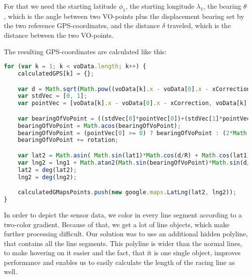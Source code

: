 For that we need the starting latitude $\phi_1$, the starting longitude $\lambda_1$, the bearing $\theta$, which is the angle between two VO-points plus the displacement bearing set by the two reference GPS-coordinates, and the distance $\delta$ traveled, which is the distance between the two VO-points.

The resulting GPS-coordinates are calculated like this:

\begin{lstlisting}[language=JavaScript]
for (var k = 1; k < voData.length; k++) {
	calculatedGPS[k] = {};

	var d = Math.sqrt(Math.pow((voData[k].x - voData[0].x - xCorrection), 2) + Math.pow((voData[k].y - voData[0].y - yCorrection), 2)) * voScaleFactor / 1000;
	var stdVec = [0, 1];
	var pointVec = [voData[k].x - voData[0].x - xCorrection, voData[k].y - voData[0].y - yCorrection];

	var bearingOfVoPoint = ((stdVec[0]*pointVec[0])+(stdVec[1]*pointVec[1]))/(Math.sqrt(Math.pow(stdVec[0], 2)+Math.pow(stdVec[1], 2))*Math.sqrt(Math.pow(pointVec[0], 2)+Math.pow(pointVec[1], 2)));
	bearingOfVoPoint = Math.acos(bearingOfVoPoint);
	bearingOfVoPoint = (pointVec[0] >= 0) ? bearingOfVoPoint : (2*Math.PI)-bearingOfVoPoint;
	bearingOfVoPoint += rotation;

	var lat2 = Math.asin( Math.sin(lat1)*Math.cos(d/R) + Math.cos(lat1)*Math.sin(d/R)*Math.cos(bearingOfVoPoint) );
	var lng2 = lng1 + Math.atan2(Math.sin(bearingOfVoPoint)*Math.sin(d/R)*Math.cos(lat1), Math.cos(d/R)-Math.sin(lat1)*Math.sin(lat2));
	lat2 = deg(lat2);
	lng2 = deg(lng2);

	calculatedGMapsPoints.push(new google.maps.LatLng(lat2, lng2));
}
\end{lstlisting}

In order to depict the sensor data, we color in every line segment according to a two-color gradient. Because of that, we get a lot of line objects, which make further processing difficult. Our solution was to use an additional hidden polyline, that contains all the line segments. This polyline is wider than the normal lines, to make hovering on it easier and the fact, that it is one single object, improves performance and enables us to easily calculate the length of the racing line as well.

\clearpage
